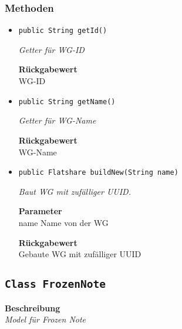     \subsubsection*{Methoden}
    \begin{itemize}
    	\item{\texttt{public String getId()}}
    	
    	\textit{Getter für WG-ID}
    	
    	
    	
    	\textbf{Rückgabewert} \\
    	WG-ID        \item{\texttt{public String getName()}}
    	
    	\textit{Getter für WG-Name}
    	
    	
    	
    	\textbf{Rückgabewert} \\
    	WG-Name        \item{\texttt{public Flatshare buildNew(String name)}}
    	
    	\textit{Baut WG mit zufälliger UUID.}
    	
    	\textbf{Parameter} \\
    	name Name von der WG
    	
    	\textbf{Rückgabewert} \\
    	Gebaute WG mit zufälliger UUID
    \end{itemize}
    \subsection{\texttt{Class FrozenNote}}
    \textbf{Beschreibung} \\
    \textit{Model für Frozen Note}

